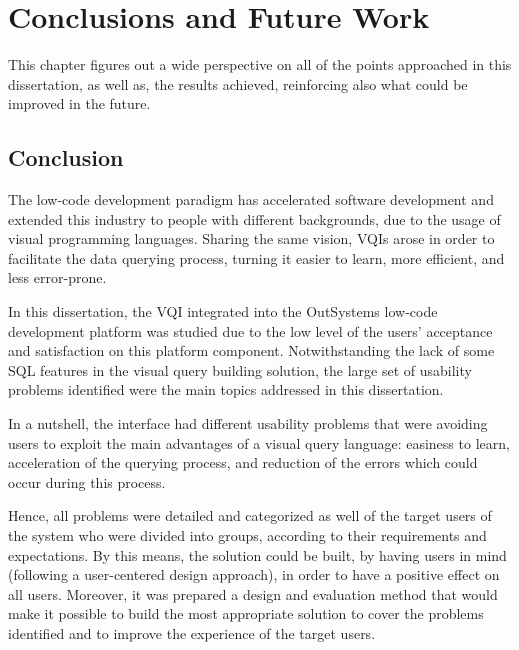 

\chapter{Conclusions and Future Work}
\label{cha:conclusions_and_future_work}

This chapter figures out a wide perspective on all of the points approached in this dissertation, as well as, the results achieved, reinforcing also what could be improved in the future.

\section{Conclusion}
\label{sec:conclusion}

The low-code development paradigm has accelerated software development and extended this industry to people with different backgrounds, due to the usage of visual programming languages. Sharing the same vision, \glspl{VQI} arose in order to facilitate the data querying process, turning it easier to learn, more efficient, and less error-prone.

In this dissertation, the \gls{VQI} integrated into the OutSystems low-code development platform was studied due to the low level of the users' acceptance and satisfaction on this platform component. Notwithstanding the lack of some \gls{SQL} features in the visual query building solution, the large set of usability problems identified were the main topics addressed in this dissertation.

In a nutshell, the interface had different usability problems that were avoiding users to exploit the main advantages of a visual query language: easiness to learn, acceleration of the querying process, and reduction of the errors which could occur during this process. 

Hence, all problems were detailed and categorized as well of the target users of the system who were divided into groups, according to their requirements and expectations. By this means, the solution could be built, by having users in mind (following a user-centered design approach), in order to have a positive effect on all users. Moreover, it was prepared a design and evaluation method that would make it possible to build the most appropriate solution to cover the problems identified and to improve the experience of the target users.

